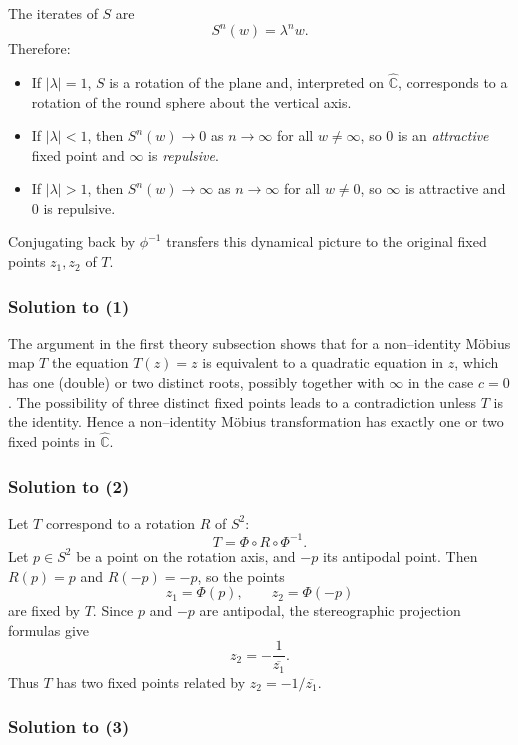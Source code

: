 \documentclass[12pt,a4paper]{article}
\theoremstyle{plain}
\theoremstyle{definition}      %
\begin{document}
The iterates of $S$ are
\[
S^{n}(w) = \lambda^{n}w.
\]
Therefore:
\begin{itemize}
	\item If $|\lambda|=1$, $S$ is a rotation of the plane and, interpreted on
	$\widehat{\mathbb{C}}$, corresponds to a rotation of the round
	sphere about the vertical axis.
	\item If $|\lambda|<1$, then $S^{n}(w)\to 0$ as $n\to\infty$ for all
	$w\neq\infty$, so $0$ is an \emph{attractive} fixed point and
	$\infty$ is \emph{repulsive}.
	\item If $|\lambda|>1$, then $S^{n}(w)\to\infty$ as $n\to\infty$ for all
	$w\neq 0$, so $\infty$ is attractive and $0$ is repulsive.
\end{itemize}
Conjugating back by $\phi^{-1}$ transfers this dynamical picture to the
original fixed points $z_{1},z_{2}$ of $T$.

\subsubsection*{Solution to (1)}

The argument in the first theory subsection shows that for a non–identity
M\"obius map $T$ the equation $T(z)=z$ is equivalent to a quadratic
equation in $z$, which has one (double) or two distinct roots, possibly
together with $\infty$ in the case $c=0$.  The possibility of three
distinct fixed points leads to a contradiction unless $T$ is the identity.
Hence a non–identity M\"obius transformation has exactly one or two fixed
points in $\widehat{\mathbb{C}}$.

\subsubsection*{Solution to (2)}

Let $T$ correspond to a rotation $R$ of $S^{2}$:
\[
T = \Phi\circ R\circ\Phi^{-1}.
\]
Let $p\in S^{2}$ be a point on the rotation axis, and $-p$ its antipodal
point.  Then $R(p)=p$ and $R(-p)=-p$, so the points
\[
z_{1}=\Phi(p),\qquad z_{2}=\Phi(-p)
\]
are fixed by $T$.  Since $p$ and $-p$ are antipodal, the stereographic
projection formulas give
\[
z_{2} = -\frac{1}{\overline{z_{1}}}.
\]
Thus $T$ has two fixed points related by $z_{2}=-1/\overline{z_{1}}$.

\subsubsection*{Solution to (3)}
\end{document}
